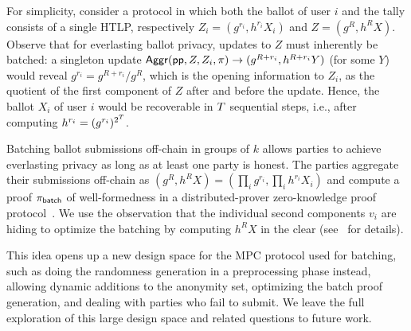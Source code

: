 For simplicity, consider a protocol in which both the ballot of user $i$ and the tally consists of a single HTLP, respectively $Z_i=(g^{r_i},h^{r_i}X_i)$ and $Z = (g^R, h^R X)$. Observe that for everlasting ballot privacy, updates to $Z$ must inherently be batched: a singleton update $\mathsf{Aggr}(\mathsf{pp}, Z, Z_i, \pi) \to (g^{R+r_i}, h^{R+r_i} Y)$ (for some $Y$) would reveal $g^{r_i} = g^{R+r_i}/g^R$, which is the opening information to $Z_i$, as the quotient of the first component of $Z$ after and before the update. Hence, the ballot $X_i$ of user $i$ would be recoverable in $T$ sequential steps, i.e., after computing $h^{r_i}=(g^{r_i})^{2^{T}}$.

Batching ballot submissions off-chain in groups of $k$ allows parties to achieve everlasting privacy as long as at least one party is honest. 
The parties aggregate their submissions off-chain as $(g^R, h^R X) = (\prod_i g^{r_i}, \prod_i h^{r_i} X_i)$ and compute a proof $\pi_{\sf batch}$ of well-formedness in a distributed-prover zero-knowledge proof protocol~\cite{PoPETS:DPPSV22}. We use the observation that the individual second components $v_i$ are hiding to optimize the batching by computing $h^R X$ in the clear
(see~ for details).

This idea opens up a new design space for the MPC protocol used for batching, such as doing the randomness generation in a preprocessing phase instead, allowing dynamic additions to the anonymity set, optimizing the batch proof generation, and dealing with parties who fail to submit. We leave the full exploration of this large design space and related questions to future work.


